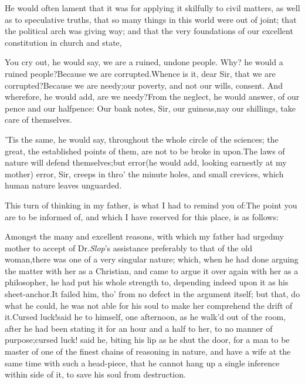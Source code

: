 \documentclass{article}
\begin{document}
He would often lament that it was for
applying it skilfully to civil matters, as well
as to speculative truths, that so many things in this world were
out of joint;\tsk\break
that the political arch was giving way;\tsk{}
and that the very foundations of our excellent constitution in
church and state, 

You cry out, he would say, we are a ruined, undone people.\tsk
Why? he would 
a ruined people?\tsk Because we are
corrup\-ted.\tsk Whence is it, dear Sir, that we are
corrupted?\tsk Because we are needy;\tsk our
poverty, and not our wills, consent.\tsk\break
And wherefore, he would add, are we needy?\tsk From the neglect, he would answer,
of our pence and our halfpence:\tsk\break
Our bank notes, Sir, our guineas,\tsk nay our shillings,
take care of themselves.

’Tis the same, he would say, throughout the whole circle
of the sciences;\tsk{}
the great, the established points of them, are not to be broke
in upon.\tsk The laws of nature will defend themselves;\tsk but
error\tsk (he would add, looking earnestly at my mother)\tsk
error, Sir, creeps in thro’ the minute holes, and small
crevices, which human nature leaves unguarded.

This turn of thinking in my father, is what I had to remind you
of:\tsk The point you are to be informed of, and which I have
reserved for this place, is as follows:

Amongst the many and excellent reasons, with which my father had
urged\break my mother to accept of Dr.\@ \textit{Slop}’s as\-sistance
preferably to that of the old wo\-man,\tsk there was one of a very
singular nature; which, when he had done arguing the matter with
her as a Christian,\break
and came to argue it over again with her
as a philosopher, he had put his whole strength to, depending
indeed upon it as his sheet-anchor.\tsh It failed him, tho’ from
no defect in the argument itself; but that, do what he could, he
was not able for his soul to make her comprehend the drift of
it.\tsh Cursed luck!\tsh said he to himself, one afternoon, as
he walk’d out of the room, after he had been stating it for an
hour and a half to her, to no manner of purpose;\tsk cursed
luck! said he, biting his lip as he shut the door,\break
\tsk for a man
to be master of one of the finest chains of reasoning in
nature,\tsh\break
and have a wife at the same time with such a
head-piece, that he cannot hang up a single inference within
side of it, to save his soul from destruction.
\end{document}
